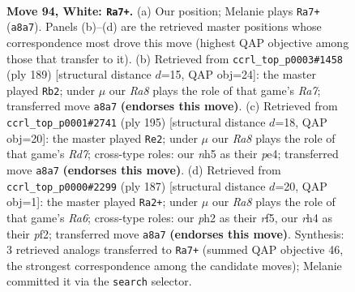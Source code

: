 \documentclass[11pt]{article}
\begin{document}
\clearpage

\begin{figure}[p]\centering
\begin{subfigure}{0.46\textwidth}\centering
\resizebox{\linewidth}{!}{%
\newchessgame
\chessboard[
  setfen={R7/5k2/8/7n/p6r/P7/7p/7K w - - 14 94},
  showmover=false,
  pgfstyle=straightmove, color=movearrow, markmove={a8-a7}
]}
\caption{}
\end{subfigure}\hfill
\begin{subfigure}{0.46\textwidth}\centering
\resizebox{\linewidth}{!}{%
\newchessgame
\chessboard[
  setfen={8/8/4K3/pPk5/P5R1/8/r7/8 b - - 88 95},
  showmover=false,
  pgfstyle=straightmove, color=movearrow, markmove={a2-b2}
]}
\caption{}
\end{subfigure}
\\[4pt]
\begin{subfigure}{0.46\textwidth}\centering
\resizebox{\linewidth}{!}{%
\newchessgame
\chessboard[
  setfen={8/6k1/4R1P1/2K5/4P3/8/3r4/8 b - - 72 98},
  showmover=false,
  pgfstyle=straightmove, color=movearrow, markmove={d2-e2}
]}
\caption{}
\end{subfigure}\hfill
\begin{subfigure}{0.46\textwidth}\centering
\resizebox{\linewidth}{!}{%
\newchessgame
\chessboard[
  setfen={8/8/7k/5R2/6p1/r5P1/3K1P2/8 b - - 93 94},
  showmover=false,
  pgfstyle=straightmove, color=movearrow, markmove={a3-a2}
]}
\caption{}
\end{subfigure}
\caption{\textbf{Move 94, White: \texttt{Ra7+}.} (a) Our position; Melanie plays \texttt{Ra7+} (\texttt{a8a7}). Panels (b)--(d) are the retrieved master positions whose correspondence most drove this move (highest QAP objective among those that transfer to it). (b) Retrieved from \texttt{ccrl\_top\_p0003\#1458} (ply 189) [structural distance $d$=15, QAP obj=24]: the master played \texttt{Rb2}; under $\mu$ our \emph{Ra8} plays the role of that game's \emph{Ra7}; transferred move \texttt{a8a7} \textbf{(endorses this move)}. (c) Retrieved from \texttt{ccrl\_top\_p0001\#2741} (ply 195) [structural distance $d$=18, QAP obj=20]: the master played \texttt{Re2}; under $\mu$ our \emph{Ra8} plays the role of that game's \emph{Rd7}; cross-type roles: our \emph{n}h5 as their \emph{p}e4; transferred move \texttt{a8a7} \textbf{(endorses this move)}. (d) Retrieved from \texttt{ccrl\_top\_p0000\#2299} (ply 187) [structural distance $d$=20, QAP obj=1]: the master played \texttt{Ra2+}; under $\mu$ our \emph{Ra8} plays the role of that game's \emph{Ra6}; cross-type roles: our \emph{p}h2 as their \emph{r}f5, our \emph{r}h4 as their \emph{p}f2; transferred move \texttt{a8a7} \textbf{(endorses this move)}. Synthesis: 3 retrieved analogs transferred to \texttt{Ra7+} (summed QAP objective 46, the strongest correspondence among the candidate moves); Melanie committed it via the \texttt{search} selector.}
\label{fig:thought-m186}
\end{figure}
\end{document}
